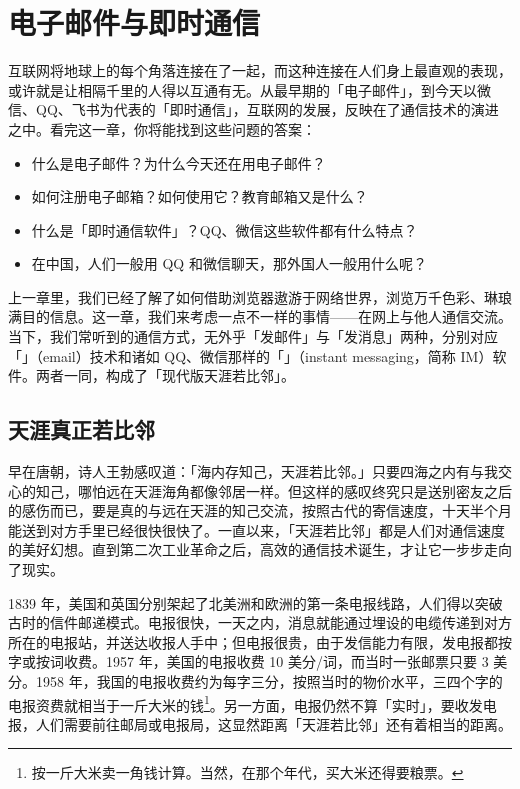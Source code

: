 
\chapter{电子邮件与即时通信}
\label{cha:mail-and-instant-messaging}

\begin{intro}
  互联网将地球上的每个角落连接在了一起，而这种连接在人们身上最直观的表现，或许就是让相隔千里的人得以互通有无。从最早期的「电子邮件」，到今天以微信、QQ、飞书为代表的「即时通信」，互联网的发展，反映在了通信技术的演进之中。看完这一章，你将能找到这些问题的答案：

  \begin{itemize}
    \item 什么是电子邮件？为什么今天还在用电子邮件？
    \item 如何注册电子邮箱？如何使用它？教育邮箱又是什么？
    \item 什么是「即时通信软件」？QQ、微信这些软件都有什么特点？
    \item 在中国，人们一般用 QQ 和微信聊天，那外国人一般用什么呢？
  \end{itemize}
\end{intro}

上一章里，我们已经了解了如何借助浏览器遨游于网络世界，浏览万千色彩、琳琅满目的信息。这一章，我们来考虑一点不一样的事情——在网上与他人通信交流。当下，我们常听到的通信方式，无外乎「发邮件」与「发消息」两种，分别对应「」（email）技术和诸如 QQ、微信那样的「」（instant messaging，简称 IM）软件。两者一同，构成了「现代版天涯若比邻」。

\section{天涯真正若比邻}

早在唐朝，诗人王勃感叹道：「海内存知己，天涯若比邻。」只要四海之内有与我交心的知己，哪怕远在天涯海角都像邻居一样。但这样的感叹终究只是送别密友之后的感伤而已，要是真的与远在天涯的知己交流，按照古代的寄信速度，十天半个月能送到对方手里已经很快很快了。一直以来，「天涯若比邻」都是人们对通信速度的美好幻想。直到第二次工业革命之后，高效的通信技术诞生，才让它一步步走向了现实。

1839 年，美国和英国分别架起了北美洲和欧洲的第一条电报线路，人们得以突破古时的信件邮递模式。电报很快，一天之内，消息就能通过埋设的电缆传递到对方所在的电报站，并送达收报人手中；但电报很贵，由于发信能力有限，发电报都按字或按词收费。1957 年，美国的电报收费 10 美分/词，而当时一张邮票只要 3 美分。1958 年，我国的电报收费约为每字三分，按照当时的物价水平，三四个字的电报资费就相当于一斤大米的钱\footnote{按一斤大米卖一角钱计算。当然，在那个年代，买大米还得要粮票。}。另一方面，电报仍然不算「实时」，要收发电报，人们需要前往邮局或电报局，这显然距离「天涯若比邻」还有着相当的距离。

